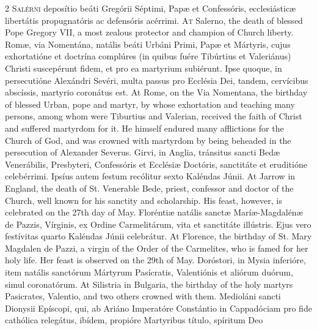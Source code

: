 \begin{paracol}{2}
\lettrine[lines=2]{S}{alérni} deposítio 
 beáti Gregórii Séptimi, Papæ et Confessóris, ecclesiásticæ libertátis 
 propugnatóris ac defensóris acérrimi.
\switchcolumn
{}
\lettrine[lines=2]{A}{t} Salerno, the death of blessed 
 Pope Gregory VII, a most zealous protector and champion of Church liberty.
\switchcolumn*
{}
Romæ, via Nomentána, 
 natális beáti Urbáni Primi, Papæ et Mártyris, cujus exhortatióne et doctrína 
 complúres (in quibus fuére Tibúrtius et Valeriánus) Christi suscepérunt 
 fidem, et pro ea martyrium subiérunt. Ipse quoque, in persecutióne 
 Alexándri Sevéri, multa passus pro Ecclésia Dei, tandem, cervícibus 
 abscíssis, martyrio coronátus est.
\switchcolumn
{}
At Rome, on the Via Nomentana, the 
 birthday of blessed Urban, pope and martyr, by whose exhortation and 
 teaching many persons, among whom were Tiburtius and Valerian, received the 
 faith of Christ and suffered martyrdom for it. He himself endured many 
 afflictions for the Church of God, and was crowned with martyrdom by being 
 beheaded in the persecution of Alexander Severus.
\switchcolumn*
{}
Girvi, in Anglia, 
 tránsitus sancti Bedæ Venerábilis, Presbyteri, Confessóris et Ecclésiæ 
 Doctóris, sanctitáte et eruditióne celebérrimi. Ipsíus autem festum 
 recólitur sexto Kaléndas Júnii.
\switchcolumn
{}
At Jarrow in England, the death of 
 St. Venerable Bede, priest, confessor and doctor of the Church, well known 
 for his sanctity and scholarship. His feast, however, is celebrated on 
 the 27th day of May.
\switchcolumn*
{}
Floréntiæ natális 
 sanctæ Maríæ-Magdalénæ de Pazzis, Vírginis, ex Ordine Carmelitárum, vita et 
 sanctitáte illústris. Ejus vero festívitas quarto Kaléndas Júnii 
 celebrátur.
\switchcolumn
{}
At Florence, the birthday of St. 
 Mary Magdalen de Pazzi, a virgin of the Order of the Carmelites, who is 
 famed for her holy life. Her feast is observed on the 29th of May.
\switchcolumn*
{}
Doróstori, in Mysia 
 inferióre, item natális sanctórum Mártyrum Pasícratis, Valentiónis et 
 aliórum duórum, simul coronatórum.
\switchcolumn
{}
At Silistria in Bulgaria, the 
 birthday of the holy martyrs Pasicrates, Valentio, and two others crowned 
 with them.
\switchcolumn*
{}
Medioláni sancti 
 Dionysii Epíscopi, qui, ab Ariáno Imperatóre Constántio in Cappadóciam pro 
 fide cathólica relegátus, ibídem, propióre Martyribus título, spíritum Deo 

\end{paracol}
